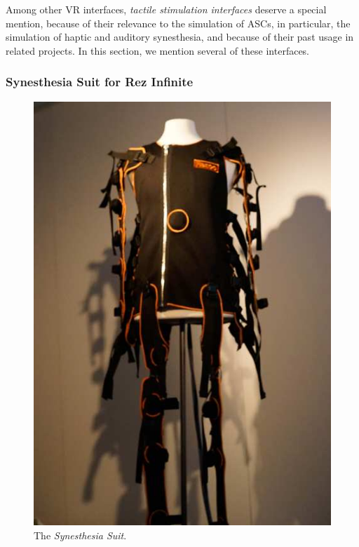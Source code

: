 Among other \ac{VR} interfaces, \textit{tactile stimulation interfaces} deserve a special mention, because of their relevance to the simulation of \acp{ASC}, in particular, the simulation of haptic and auditory synesthesia, and because of their past usage in related projects. In this section, we mention several of these interfaces.

\newpage
\subsubsection{Synesthesia Suit for Rez Infinite}\label{sec:synesthesia_suit}
\begin{figure}
    \centering
    \ifgraphics
        \includegraphics[width=\textwidth * \real{0.40}]{img/reused/konishi2016synesthesia.png}
    \fi
    \caption{The \textit{Synesthesia Suit}.\protect\footnotemark}
\end{figure}


